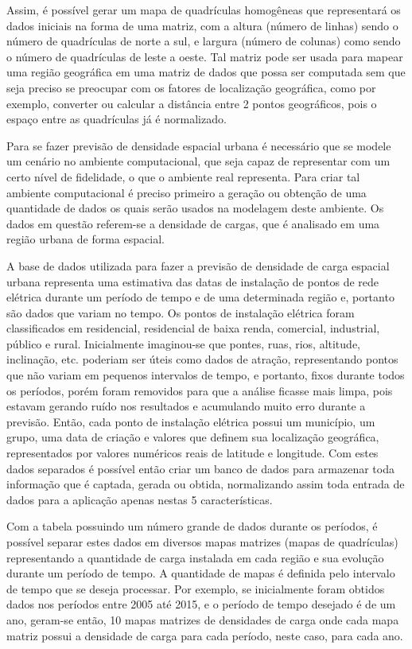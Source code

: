 Assim, é possível gerar um mapa de quadrículas homogêneas que representará os dados iniciais na forma de uma matriz, com a altura (número de linhas) sendo o número de quadrículas de norte a sul, e largura (número de colunas) como sendo o número de quadrículas de leste a oeste. Tal matriz pode ser usada para mapear uma região geográfica em uma matriz de dados que possa ser computada sem que seja preciso se preocupar com os fatores de localização geográfica, como por exemplo, converter ou calcular a distância entre 2 pontos geográficos, pois o espaço entre as quadrículas já é normalizado.

Para se fazer previsão de densidade espacial urbana é necessário que se modele um cenário no ambiente computacional, que seja capaz de representar com um certo nível de fidelidade, o que o ambiente real representa. Para criar tal ambiente computacional é preciso primeiro a geração ou obtenção de uma quantidade de dados os quais serão usados na modelagem deste ambiente. Os dados em questão referem-se a densidade de cargas, que é analisado em uma região urbana de forma espacial. 

A base de dados utilizada para fazer a previsão de densidade de carga espacial urbana representa uma estimativa das datas de instalação de pontos de rede elétrica  durante um período de tempo e de uma determinada região e, portanto são dados que variam no tempo. Os pontos de instalação elétrica foram classificados em residencial, residencial de baixa renda, comercial, industrial, público e rural. Inicialmente imaginou-se que pontes, ruas, rios, altitude, inclinação, etc. poderiam ser úteis como dados de atração, representando pontos que não variam em pequenos intervalos de tempo, e portanto, fixos durante todos os períodos, porém foram removidos para que a análise ficasse mais limpa, pois estavam gerando ruído nos resultados e acumulando muito erro durante a previsão. Então, cada ponto de instalação elétrica possui um município, um grupo, uma data de criação e valores que definem sua localização geográfica, representados por valores numéricos reais de latitude e longitude. Com estes dados separados é possível então criar um banco de dados para armazenar toda informação que é captada, gerada ou obtida, normalizando assim toda entrada de dados para a aplicação apenas nestas 5 características.

Com a tabela possuindo um número grande de dados durante os períodos, é possível separar estes dados em diversos mapas matrizes (mapas de quadrículas) representando a quantidade de carga instalada em cada região e sua evolução durante um período de tempo. A quantidade de mapas é definida pelo intervalo de tempo que se deseja processar. Por exemplo, se inicialmente foram obtidos dados nos períodos entre 2005 até 2015, e o período de tempo desejado é de um ano, geram-se então, 10 mapas matrizes de densidades de carga onde cada mapa matriz possui a densidade de carga para cada período, neste caso, para cada ano.

